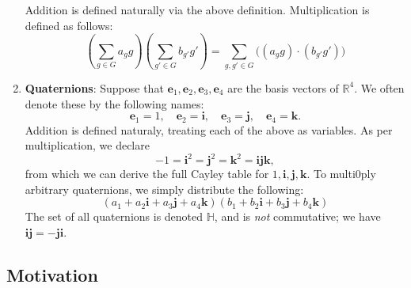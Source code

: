 \documentclass[11pt]{article}
\renewcommand{\vec}[1]{\mathbf{#1}}
\begin{document}
\begin{enumerate}
\[	\]
	Addition is defined naturally via the above definition. Multiplication is defined as follows:
	\[
		\left( \sum\limits_{g \in G} a_{g} g \right) \left( \sum\limits_{g' \in G} b_{g'} g'  \right) = \sum\limits_{g, g' \in G} \Big( (a_{g} g) \cdot (b_{g'} g') \Big)
	\]
	\item \textbf{Quaternions}: Suppose that $\vec{e}_{1}, \vec{e}_{2}, \vec{e}_{3}, \vec{e}_{4}$ are the basis vectors of $\mathbb{R}^{4}$. We often denote these by the following names:
	\[
		\vec{e}_{1} = 1, \quad \vec{e}_{2} = \vec{i}, \quad \vec{e}_{3} = \vec{j}, \quad \vec{e}_{4} = \vec{k}.
	\]
	Addition is defined naturaly, treating each of the above as variables. As per multiplication, we declare
	\[
		-1 = \vec{i}^{2} = \vec{j}^{2} = \vec{k}^{2} = \vec{i}\vec{j}\vec{k},
	\]
	from which we can derive the full Cayley table for $1, \vec{i}, \vec{j}, \vec{k}$. To multi0ply arbitrary quaternions, we simply distribute the following:
	\[
		(a_{1} + a_{2} \vec{i} + a_{3} \vec{j} + a_{4} \vec{k})(b_{1} + b_{2} \vec{i} + b_{3} \vec{j} + b_{4} \vec{k})
	\]
	The set of all quaternions is denoted $\mathbb{H}$, and is \textit{not} commutative; we have $\vec{ij} = -\vec{ji}$.
\end{enumerate}


\subsection{Motivation}
\end{document}
